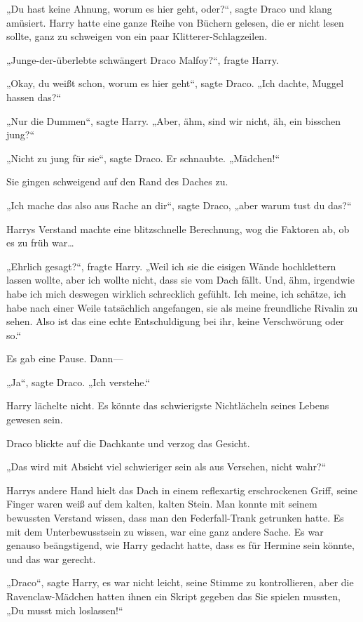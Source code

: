 {„Du hast keine Ahnung, worum es hier geht, oder?“, sagte Draco und klang amüsiert. Harry hatte eine ganze Reihe von Büchern gelesen, die er nicht lesen sollte, ganz zu schweigen von ein paar Klitterer-Schlagzeilen.

„Junge-der-überlebte schwängert Draco Malfoy?“, fragte Harry.

„Okay, du weißt schon, worum es hier geht“, sagte Draco. „Ich dachte, Muggel hassen das?“

„Nur die Dummen“, sagte Harry. „Aber, ähm, sind wir nicht, äh, ein bisschen jung?“

„Nicht zu jung für sie“, sagte Draco. Er schnaubte. „Mädchen!“

Sie gingen schweigend auf den Rand des Daches zu.

„Ich mache das also aus Rache an dir“, sagte Draco, „aber warum tust du das?“

Harrys Verstand machte eine blitzschnelle Berechnung, wog die Faktoren ab, ob es zu früh war…

„Ehrlich gesagt?“, fragte Harry. „Weil ich sie die eisigen Wände hochklettern lassen wollte, aber ich wollte nicht, dass sie vom Dach fällt. Und, ähm, irgendwie habe ich mich deswegen wirklich schrecklich gefühlt. Ich meine, ich schätze, ich habe nach einer Weile tatsächlich angefangen, sie als meine freundliche Rivalin zu sehen. Also ist das eine echte Entschuldigung bei ihr, keine Verschwörung oder so.“

Es gab eine Pause. Dann—

„Ja“, sagte Draco. „Ich verstehe.“

Harry lächelte nicht. Es könnte das schwierigste Nichtlächeln seines Lebens gewesen sein.

Draco blickte auf die Dachkante und verzog das Gesicht.

„Das wird mit Absicht viel schwieriger sein als aus Versehen, nicht wahr?“

Harrys andere Hand hielt das Dach in einem reflexartig erschrockenen Griff, seine Finger waren weiß auf dem kalten, kalten Stein. Man konnte mit seinem bewussten Verstand wissen, dass man den Federfall-Trank getrunken hatte. Es mit dem Unterbewusstsein zu wissen, war eine ganz andere Sache. Es war genauso beängstigend, wie Harry gedacht hatte, dass es für Hermine sein könnte, und das war gerecht.

„Draco“, sagte Harry, es war nicht leicht, seine Stimme zu kontrollieren, aber die Ravenclaw-Mädchen hatten ihnen ein Skript gegeben das Sie spielen mussten, „Du musst mich loslassen!“

}

